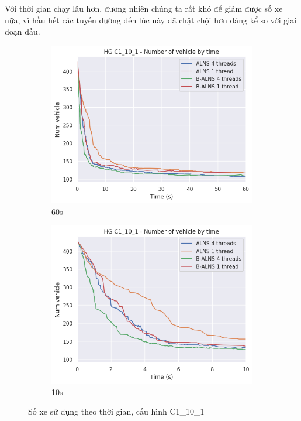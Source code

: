 Với thời gian chạy lâu hơn, đương nhiên chúng ta rất khó để giảm được số xe nữa, vì hầu hết các tuyến đường đến lúc này đã chật chội hơn đáng kể so với giai đoạn đầu.

\begin{figure}[H] %
  \label{fig:perf_ct_c1_10}
  \begin{subfigure}{.5\textwidth}
    \centering
    \includegraphics[width=0.9\linewidth]{figures/nv_time_60s_C1_10_1.png}
    \caption{60s}
    \label{fig:perf_ct_c1_10_60s}
  \end{subfigure}%
  \begin{subfigure}{.5\textwidth}
    \centering
    \includegraphics[width=0.9\linewidth]{figures/nv_time_10s_C1_10_1.png}
    \caption{10s}
    \label{fig:perf_ct_c1_10_10s}
  \end{subfigure}
  \caption{Số xe sử dụng theo thời gian, cấu hình C1\_10\_1}
\end{figure}

